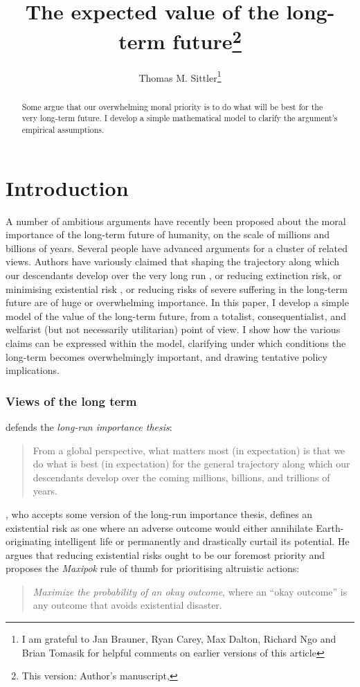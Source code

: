 \documentclass[british]{article}
\title{The expected value of the long-term future\footnote{This version: Author's manuscript, \DTMnow}}
\date{}
\author{Thomas M. Sittler\footnote{I am grateful to Jan Brauner, Ryan Carey, Max Dalton, Richard Ngo and Brian Tomasik for helpful comments on earlier versions of this article}}
\begin{document}
\maketitle

\begin{abstract}
Some argue that our overwhelming moral priority is to do what will be best for the very long-term future. I develop a simple mathematical model to clarify the argument's empirical assumptions.
\end{abstract}

\section{Introduction}
A number of ambitious arguments have recently been proposed about the moral importance of the long-term future of humanity, on the scale of millions and billions of years. Several people have advanced arguments for a cluster of related views. Authors have variously claimed that shaping the trajectory along which our descendants develop over the very long run \citep{beckstead_overwhelming_2013-2}, or reducing extinction risk, or minimising existential risk \citep{bostrom_existential_2002}, or reducing risks of severe suffering in the long-term future \citep{althaus_reducing_2016} are of huge or overwhelming importance. In this paper, I develop a simple model of the value of the long-term future, from a totalist, consequentialist, and welfarist (but not necessarily utilitarian) point of view. I show how the various claims can be expressed within the model, clarifying under which conditions the long-term becomes overwhelmingly important, and drawing tentative policy implications. 

\subsubsection*{Views of the long term}\label{claims}
\cite{beckstead_overwhelming_2013-2} defends the \emph{long-run importance thesis}:
\begin{quote}
From a global perspective, what matters most (in
expectation) is that we do what is best (in expectation) for the general
trajectory along which our descendants develop over the coming millions,
billions, and trillions of years.
\end{quote}

\cite{bostrom_existential_2002}, who accepts some version of the long-run importance thesis, defines an existential risk as one where an adverse outcome would either annihilate Earth-originating
intelligent life or permanently and drastically curtail its potential. He argues that reducing existential risks ought to be our foremost priority and proposes the \emph{Maxipok} rule of thumb for prioritising altruistic actions: 
\begin{quote}
\emph{Maximize the probability of an okay outcome}, where an ``okay
outcome'' is any outcome that avoids existential disaster.
\end{quote}
\end{document}
